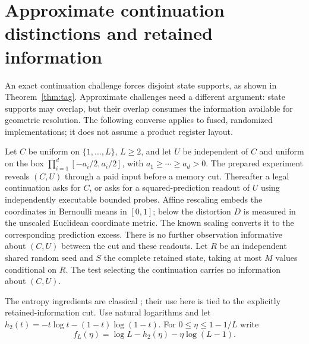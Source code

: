 \section{Approximate continuation distinctions and retained information}\label{sec:soft-state}
An exact continuation challenge forces disjoint state supports, as shown in Theorem~\ref{thm:tag}. Approximate challenges need a different argument: state supports may overlap, but their overlap consumes the information available for geometric resolution. The following converse applies to fused, randomized implementations; it does not assume a product register layout.

Let $C$ be uniform on $\{1,\ldots,L\}$, $L\ge2$, and let $U$ be independent of $C$ and uniform on the box $\prod_{i=1}^d[-a_i/2,a_i/2]$, with $a_1\ge\cdots\ge a_d>0$. The prepared experiment reveals $(C,U)$ through a paid input before a memory cut. Thereafter a legal continuation asks for $C$, or asks for a squared-prediction readout of $U$ using independently executable bounded probes. Affine rescaling embeds the coordinates in Bernoulli means in $[0,1]$; below the distortion $D$ is measured in the unscaled Euclidean coordinate metric. The known scaling converts it to the corresponding prediction excess. There is no further observation informative about $(C,U)$ between the cut and these readouts. Let $R$ be an independent shared random seed and $S$ the complete retained state, taking at most $M$ values conditional on $R$. The test selecting the continuation carries no information about $(C,U)$.

The entropy ingredients are classical \cite{cover}; their use here is tied to the explicitly retained-information cut. Use natural logarithms and let $h_2(t)=-t\log t-(1-t)\log(1-t)$. For $0\le\eta\le1-1/L$ write
\[
 f_L(\eta)=\log L-h_2(\eta)-\eta\log(L-1).
\]

